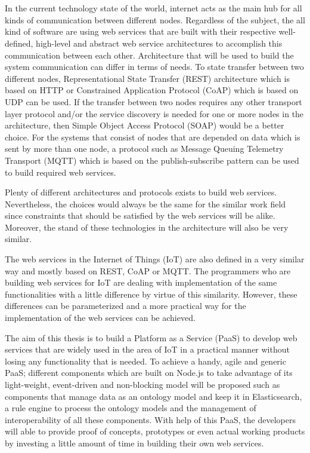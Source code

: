 \chapter{\abstractname}



In the current technology state of the world, internet acts as the main hub for all kinds of communication between different nodes. Regardless of the subject, the all kind of software are using web services that are built with their respective well-defined, high-level and abstract web service architectures to accomplish this communication between each other. Architecture that will be used to build the system communication can differ in terms of needs. To state transfer between two different nodes, Representational State Transfer (REST) architecture which is based on HTTP or Constrained Application Protocol (CoAP) which is based on UDP can be used. If the transfer between two nodes requires any other transport layer protocol and/or the service discovery is needed for one or more nodes in the architecture, then Simple Object Access Protocol (SOAP) would be a better choice. For the systems that consist of nodes that are depended on data which is sent by more than one node, a protocol such as Message Queuing Telemetry Transport (MQTT) which is based on the publish-subscribe pattern can be used to build required web services.

Plenty of different architectures and protocols exists to build web services. Nevertheless, the choices would always be the same for the similar work field since constraints that should be satisfied by the web services will be alike. Moreover, the stand of these technologies in the architecture will also be very similar.

The web services in the Internet of Things (IoT) are also defined in a very similar way and mostly based on REST, CoAP or MQTT. The programmers who are building web services for IoT are dealing with implementation of the same functionalities with a little difference by virtue of this similarity. However, these differences can be parameterized and a more practical way for the implementation of the web services can be achieved.

The aim of this thesis is to build a Platform as a Service (PaaS) to develop web services that are widely used in the area of IoT in a practical manner without losing any functionality that is needed. To achieve a handy, agile and generic PaaS; different components which are built on Node.js to take advantage of its light-weight, event-driven and non-blocking model will be proposed such as components that manage data as an ontology model and keep it in Elasticsearch, a rule engine to process the ontology models and the management of interoperability of all these components. With help of this PaaS, the developers will able to provide proof of concepts, prototypes or even actual working products by investing a little amount of time in building their own web services.